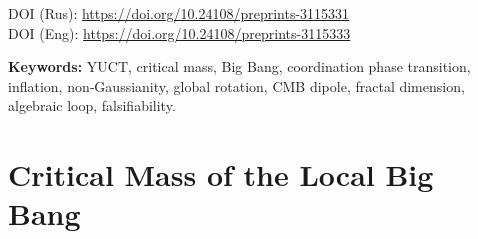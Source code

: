 \documentclass[12pt,a4paper]{article}
\begin{document}
	DOI (Rus): \url{https://doi.org/10.24108/preprints-3115331} \\
	DOI (Eng): \url{https://doi.org/10.24108/preprints-3115333}
	
	\vspace{0.1cm}
	\noindent
	{\color{darkblue}\textbf{Keywords:}} YUCT, critical mass, Big Bang, coordination phase transition, inflation, non‑Gaussianity, global rotation, CMB dipole, fractal dimension, algebraic loop, falsifiability.
	
	\vspace{0.1cm}
	\noindent
		
	\vspace{0.4cm}
\clearpage
\tableofcontents
\clearpage
		
	\part{Critical Mass of the Local Big Bang}
	\label{part:I}
	
\end{document}
